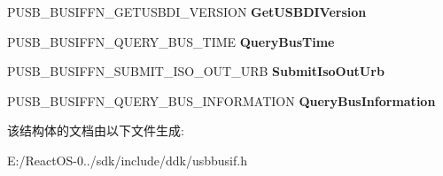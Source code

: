 \begin{DoxyCompactItemize}
P\+U\+S\+B\+\_\+\+B\+U\+S\+I\+F\+F\+N\+\_\+\+G\+E\+T\+U\+S\+B\+D\+I\+\_\+\+V\+E\+R\+S\+I\+ON {\bfseries Get\+U\+S\+B\+D\+I\+Version}
\item 
\mbox{\label{struct___u_s_b___b_u_s___i_n_t_e_r_f_a_c_e___u_s_b_d_i___v0_ad3ca353e20c459b7448fc8c7ebb9304a}} 
P\+U\+S\+B\+\_\+\+B\+U\+S\+I\+F\+F\+N\+\_\+\+Q\+U\+E\+R\+Y\+\_\+\+B\+U\+S\+\_\+\+T\+I\+ME {\bfseries Query\+Bus\+Time}
\item 
\mbox{\label{struct___u_s_b___b_u_s___i_n_t_e_r_f_a_c_e___u_s_b_d_i___v0_a5e4f0a50ebd3c0726421823011412d3b}} 
P\+U\+S\+B\+\_\+\+B\+U\+S\+I\+F\+F\+N\+\_\+\+S\+U\+B\+M\+I\+T\+\_\+\+I\+S\+O\+\_\+\+O\+U\+T\+\_\+\+U\+RB {\bfseries Submit\+Iso\+Out\+Urb}
\item 
\mbox{\label{struct___u_s_b___b_u_s___i_n_t_e_r_f_a_c_e___u_s_b_d_i___v0_a4d8cf5d5f668a00b784cb4671955c597}} 
P\+U\+S\+B\+\_\+\+B\+U\+S\+I\+F\+F\+N\+\_\+\+Q\+U\+E\+R\+Y\+\_\+\+B\+U\+S\+\_\+\+I\+N\+F\+O\+R\+M\+A\+T\+I\+ON {\bfseries Query\+Bus\+Information}
\end{DoxyCompactItemize}


该结构体的文档由以下文件生成\+:\begin{DoxyCompactItemize}
\item 
E\+:/\+React\+O\+S-\/0../sdk/include/ddk/usbbusif.\+h\end{DoxyCompactItemize}
